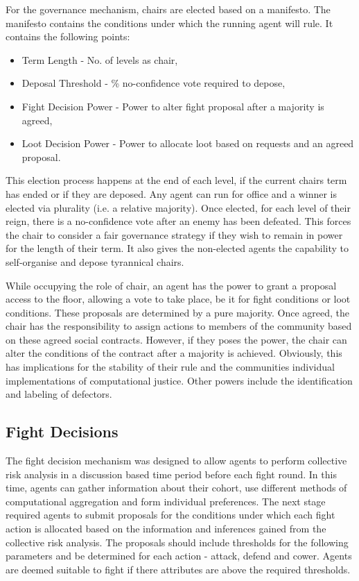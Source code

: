 For the governance mechanism, chairs are elected based on a manifesto. The manifesto contains the conditions under which the running agent will rule. It contains the following points:

\begin{itemize}
    \item Term Length - No. of levels as chair,
    \item Deposal Threshold - \% no-confidence vote required to depose,
    \item Fight Decision Power - Power to alter fight proposal after a majority is agreed,
    \item Loot Decision Power - Power to allocate loot based on requests and an agreed proposal.
\end{itemize}

This election process happens at the end of each level, if the current chairs term has ended or if they are deposed. Any agent can run for office and a winner is elected via plurality (i.e. a relative majority). Once elected, for each level of their reign, there is a no-confidence vote after an enemy has been defeated. This forces the chair to consider a fair governance strategy if they wish to remain in power for the length of their term. It also gives the non-elected agents the capability to self-organise and depose tyrannical chairs. 

While occupying the role of chair, an agent has the power to grant a proposal access to the floor, allowing a vote to take place, be it for fight conditions or loot conditions. These proposals are determined by a pure majority. Once agreed, the chair has the responsibility to assign actions to members of the community based on these agreed social contracts. However, if they poses the power, the chair can alter the conditions of the contract after a majority is achieved. Obviously, this has implications for the stability of their rule and the communities individual implementations of computational justice. Other powers include the identification and labeling of defectors. 


\subsection{Fight Decisions}\label{sec: fight decision}


The fight decision mechanism was designed to allow agents to perform collective risk analysis in a discussion based time period before each fight round. In this time, agents can gather information about their cohort, use different methods of computational aggregation and form individual preferences. The next stage required agents to submit proposals for the conditions under which each fight action is allocated based on the information and inferences gained from the collective risk analysis. The proposals should include thresholds for the following parameters and be determined for each action - attack, defend and cower. Agents are deemed suitable to fight if there attributes are above the required thresholds.  

